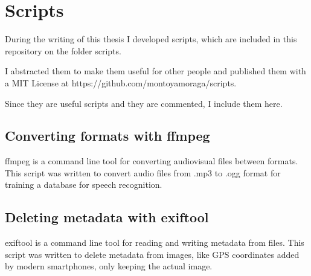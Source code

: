\chapter{Scripts}

During the writing of this thesis I developed scripts, which are included in this repository on the folder scripts.

I abstracted them to make them useful for other people and published them with a MIT License at https://github.com/montoyamoraga/scripts.

Since they are useful scripts and they are commented, I include them here.

\section{Converting formats with ffmpeg}

ffmpeg is a command line tool for converting audiovisual files between formats. This script was written to convert audio files from .mp3 to .ogg format for training a database for speech recognition.



\section{Deleting metadata with exiftool}

exiftool is a command line tool for reading and writing metadata from files. This script was written to delete metadata from images, like GPS coordinates added by modern smartphones, only keeping the actual image.

